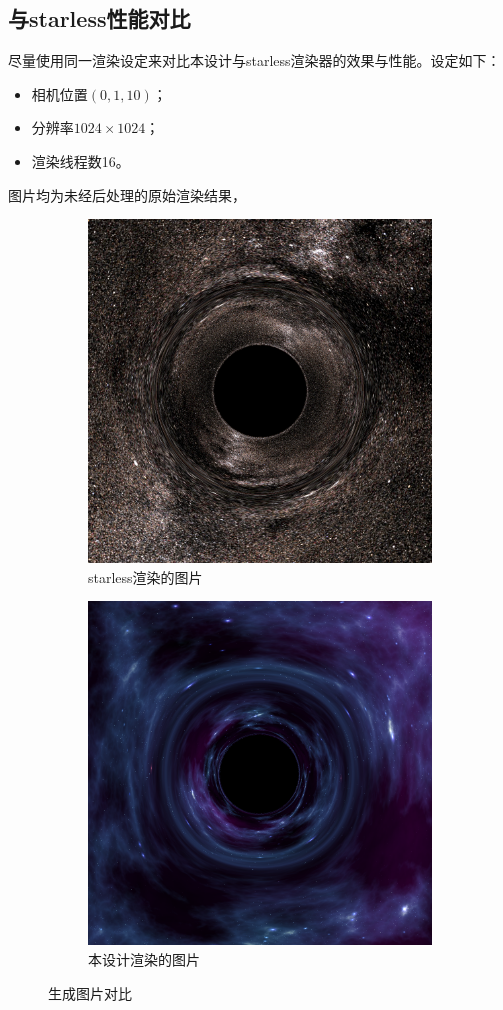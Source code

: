 \subsection{与starless性能对比}
尽量使用同一渲染设定来对比本设计与starless渲染器的效果与性能。设定如下：
\begin{itemize}
    \item 相机位置$(0, 1, 10)$；
    \item 分辨率$1024\times1024$；
    \item 渲染线程数16。
\end{itemize}
图片均为未经后处理的原始渲染结果，
\begin{figure}[H]
    \centering
    \begin{subfigure}{.5\textwidth}
        \centering
        \includegraphics[width=.8\linewidth]{images/starless_test.png}
        \caption{starless渲染的图片}
        \label{fig:starless_test}
    \end{subfigure}%
    \begin{subfigure}{.5\textwidth}
        \centering
        \includegraphics[width=.8\linewidth]{images/blackness_test.png}
        \caption{本设计渲染的图片}
        \label{fig:blackness_test}
    \end{subfigure}
    \caption{生成图片对比}
\end{figure}


